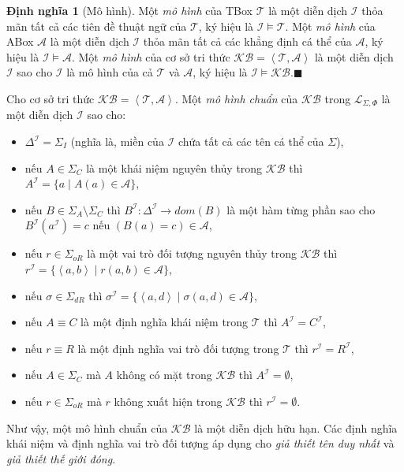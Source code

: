 \documentclass[12pt,a4paper,twoside]{report}
\newcommand{\mL}		{\mathcal{L}}
\newcommand{\mA}		{\mathcal{A}}
\newcommand{\mT}		{\mathcal{T}}
\newcommand{\mI}		{\mathcal{I}}
\newcommand{\SigmaI}	{\Sigma_I}
\newcommand{\SigmaA}	{\Sigma_A}
\newcommand{\SigmaC}	{\Sigma_C}
\newcommand{\SigmaOR}	{\Sigma_{oR}}
\newcommand{\SigmaDR}	{\Sigma_{dR}}
\newcommand{\KB}		{\mathcal{KB}}
\newcommand{\mLSP}		{\mL_{\Sigma,\Phi}}
\newcommand{\myend}		{\mbox{}\hfill\mbox{{\scriptsize$\!\blacksquare$}}}
\newcommand{\tuple}[1]	{\left\langle#1\right\rangle\!}
\newcommand{\Dom}		{\mathit{dom}}
\theoremstyle{definition}
\newtheorem{Definition}{Định nghĩa}[chapter]
\begin{document}
\begin{Definition}[Mô hình]
Một {\em mô hình} của TBox $\mT$ là một diễn dịch $\mI$ thỏa mãn tất cả các tiên đề thuật ngữ của $\mT$, ký hiệu là $\mI \models \mT$. Một {\em mô hình} của ABox $\mA$ là một diễn dịch $\mI$ thỏa mãn tất cả các khẳng định cá thể của $\mA$, ký hiệu là $\mI \models \mA$. Một {\em mô hình} của cơ sở tri thức $\KB=\tuple{\mT, \mA}$ là một diễn dịch $\mI$ sao cho $\mI$ là mô hình của cả $\mT$ và $\mA$, ký hiệu là $\mI \models \KB$.\myend
\end{Definition}

Cho cơ sở tri thức $\KB = \tuple{\mT,\mA}$. Một {\em mô hình chuẩn} của $\KB$ trong $\mLSP$ là một diễn dịch $\mI$ sao cho:
\begin{itemize}
  \item $\Delta^\mI = \SigmaI$ (nghĩa là, miền của $\mI$ chứa tất cả các tên cá thể của $\Sigma$),

  \item nếu $A \in \SigmaC$ là một khái niệm nguyên thủy trong $\KB$ thì $A^\mI = \{a \mid A(a) \in \mA\}$,

  \item nếu $B \in \SigmaA \setminus \SigmaC$ thì $B^\mI: \Delta^\mI \to \Dom(B)$ là một hàm từng phần sao cho $B^\mI(a^\mI) = c$ nếu $(B(a) = c) \in \mA$,

  \item nếu $r \in \SigmaOR$ là một vai trò đối tượng nguyên thủy trong $\KB$ thì $r^\mI = \{\tuple{a,b} \mid r(a,b) \in \mA\}$,

  \item nếu $\sigma \in \SigmaDR$ thì $\sigma^\mI = \{\tuple{a,d} \mid \sigma(a,d) \in \mA\}$,
  
  \item nếu $A \equiv C$ là một định nghĩa khái niệm trong $\mT$ thì $A^\mI = C^\mI$,

  \item nếu $r \equiv R$ là một định nghĩa vai trò đối tượng trong  $\mT$ thì $r^\mI = R^\mI$,

  \item nếu $A \in \SigmaC$ mà $A$ không có mặt trong $\KB$ thì $A^\mI = \emptyset$,
  
  \item nếu $r \in \SigmaOR$ mà $r$ không xuất hiện trong $\KB$ thì $r^\mI = \emptyset$.
\end{itemize}

Như vậy, một mô hình chuẩn của $\KB$ là một diễn dịch hữu hạn. Các định nghĩa khái niệm và định nghĩa vai trò đối tượng áp dụng cho {\em giả thiết tên duy nhất} và {\em giả thiết thế giới đóng}.
\end{document}
